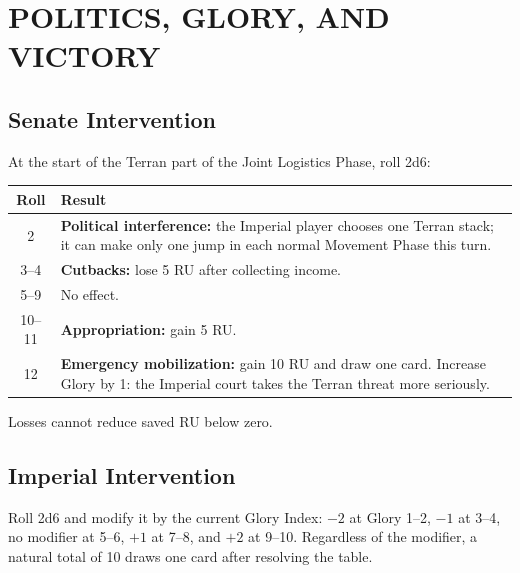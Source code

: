 \section{POLITICS, GLORY, AND VICTORY}

\subsection{Senate Intervention}

At the start of the Terran part of the Joint Logistics Phase, roll 2d6:

\begin{tabularx}{\columnwidth}{@{}cX@{}}
\toprule
Roll & Result \\
\midrule
2 & \textbf{Political interference:} the Imperial player chooses one Terran
stack; it can make only one jump in each normal Movement Phase this turn. \\
3--4 & \textbf{Cutbacks:} lose 5 RU after collecting income. \\
5--9 & No effect. \\
10--11 & \textbf{Appropriation:} gain 5 RU. \\
12 & \textbf{Emergency mobilization:} gain 10 RU and draw one card. Increase
Glory by 1: the Imperial court takes the Terran threat more seriously. \\
\bottomrule
\end{tabularx}

Losses cannot reduce saved RU below zero.

\subsection{Imperial Intervention}

Roll 2d6 and modify it by the current Glory Index: $-2$ at Glory 1--2, $-1$ at
3--4, no modifier at 5--6, $+1$ at 7--8, and $+2$ at 9--10. Regardless of the
modifier, a natural total of 10 draws one card after resolving the table.

